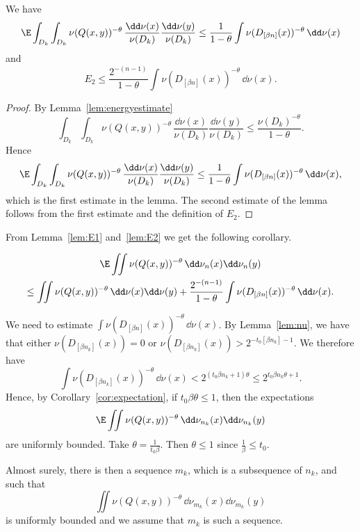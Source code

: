 \begin{lemm}\label{lem:E2}
We have
\[
\E \int_{D_k} \int_{D_k} \nu(Q(x,y))^{-\theta} \, \frac{\dd
\nu (x)}{\nu (D_k)} \frac{\dd \nu (y)}{\nu (D_k)} \leq
\frac{1}{1-\theta} \int \nu (D_{[\beta n]} (x))^{-\theta} \,
\dd \nu (x)
\]
and
\[
E_2 \leq \frac{2^{-(n-1)}}{1-\theta} \int \nu (D_{[\beta n]} (x))^{-\theta} \, \dd \nu (x).
\]
\end{lemm}

\begin{proof}
By Lemma~\ref{lem:energyestimate}
\[
\int_{D_k} \int_{D_k} \nu(Q(x,y))^{-\theta} \, \frac{\dd \nu (x)}{\nu (D_k)} \frac{\dd \nu (y)}{\nu (D_k)} \leq
\frac{\nu (D_k)^{-\theta}}{1-\theta}.
\]
Hence
\[
\E \int_{D_k} \int_{D_k} \nu(Q(x,y))^{-\theta} \, \frac{\dd
\nu (x)}{\nu (D_k)} \frac{\dd \nu (y)}{\nu (D_k)} \leq
\frac{1}{1-\theta} \int \nu (D_{[\beta n]} (x))^{-\theta} \,
\dd \nu (x),
\]
which is the first estimate in the lemma. The second estimate of the lemma follows from the first estimate and the definition of $E_2$.
\end{proof}

From Lemma~\ref{lem:E1} and~\ref{lem:E2} we get the following corollary.

\begin{coro}\label{cor:expectation}
\begin{multline*}
\E \iint \nu (Q(x,y))^{-\theta} \, \dd \nu_n (x) \dd
\nu_n (y) \\ \leq \iint \nu (Q(x,y))^{-\theta} \, \dd \nu (x) \dd \nu (y) + \frac{2^{-(n-1)}}{1-\theta} \int \nu (D_{[\beta n]} (x))^{-\theta} \, \dd \nu (x).
\end{multline*}
\end{coro}

We need to estimate $\int \nu (D_{[\beta n]} (x))^{-\theta} \,
\dd \nu(x)$. By Lemma~\ref{lem:nu}, we have that either $\nu (D_{[\beta n_k]} (x)) = 0$ or $\nu (D_{[\beta n_k]} (x)) > 2^{-t_0 [\beta n_k] - 1}$. We therefore have
\[
\int \nu (D_{[\beta n_k]} (x))^{-\theta} \, \dd \nu(x) < 2^{(t_0 \beta n_k + 1) \theta} \leq 2^{t_0 \beta n_k \theta + 1}.
\]
Hence, by Corollary~\ref{cor:expectation}, if $t_0 \beta \theta \leq 1$, then the expectations
\[
\E \iint \nu (Q(x,y))^{-\theta} \, \dd \nu_{n_k} (x) \dd
\nu_{n_k} (y)
\]
are uniformly bounded. Take $\theta = \frac{1}{t_0 \beta}$. Then $\theta \leq 1$ since $\frac{1}{\beta} \leq t_0$.

Almost surely, there is then a sequence $m_k$, which is a subsequence of $n_k$, and such that
\[
\iint \nu (Q(x,y))^{-\theta} \, \dd \nu_{m_k} (x) \dd
\nu_{m_k} (y)
\]
is uniformly bounded and we assume that $m_k$ is such a sequence.

